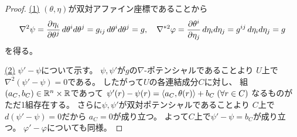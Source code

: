 \documentclass[report]{jlreq}
\begin{document}
\begin{proof}
    \uline{(1)} \quad
    $(\theta, \eta)$が双対アファイン座標であることから
    \begin{equation}
        \nabla^2 \psi
            =
                \deldel[\eta_i]{\theta^j} \, d\theta^i d\theta^j
            =
                g_{ij} \, d\theta^i d\theta^j
            =
                g,
                \quad
        \nabla^{*2} \varphi
            =
                \deldel[\theta^i]{\eta_j} \, d\eta_i d\eta_j
            =
                g^{ij} \, d\eta_i d\eta_j
            =
                g
    \end{equation}
    を得る。

    \uline{(2)} \quad
    $\psi' - \psi$について示す。
    $\psi, \psi'$が$g$の$\nabla$-ポテンシャルであることより
    $U$上で$\nabla^2 (\psi' - \psi) = 0$である。
    したがって$U$の各連結成分$C$に対し、
    組$(a_C, b_C) \in \mathbb{R}^n \times \mathbb{R}$であって
    $\psi'(r) - \psi(r)
        = \left\langle{a_C},{\theta(r)}\right\rangle + b_C \;
        (\forall r \in C)$
    なるものがただ1組存在する。
    さらに$\psi, \psi'$が双対ポテンシャルであることより
    $C$上で$d(\psi' - \psi) = 0$だから
    $a_C = 0$が成り立つ。
    よって$C$上で$\psi' - \psi = b_C$が成り立つ。
    $\varphi' - \varphi$についても同様。
\end{proof}

\begin{definition}[統計的多様体]
    \TODO{}
\end{definition}
\end{document}
